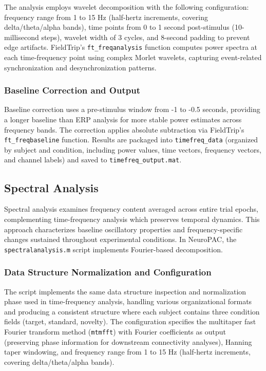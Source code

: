 \documentclass[12pt]{report}
\begin{document}
The analysis employs wavelet decomposition with the following configuration: frequency range from 1 to 15 Hz (half-hertz increments, covering delta/theta/alpha bands), time points from 0 to 1 second post-stimulus (10-millisecond steps), wavelet width of 3 cycles, and 8-second padding to prevent edge artifacts. FieldTrip's \verb|ft_freqanalysis| function computes power spectra at each time-frequency point using complex Morlet wavelets, capturing event-related synchronization and desynchronization patterns.

\subsubsection{Baseline Correction and Output}

Baseline correction uses a pre-stimulus window from -1 to -0.5 seconds, providing a longer baseline than ERP analysis for more stable power estimates across frequency bands. The correction applies absolute subtraction via FieldTrip's \verb|ft_freqbaseline| function. Results are packaged into \verb|timefreq_data| (organized by subject and condition, including power values, time vectors, frequency vectors, and channel labels) and saved to \verb|timefreq_output.mat|.

\subsection{Spectral Analysis}

Spectral analysis examines frequency content averaged across entire trial epochs, complementing time-frequency analysis which preserves temporal dynamics. This approach characterizes baseline oscillatory properties and frequency-specific changes sustained throughout experimental conditions. In NeuroPAC, the \verb|spectralanalysis.m| script implements Fourier-based decomposition.

\subsubsection{Data Structure Normalization and Configuration}

The script implements the same data structure inspection and normalization phase used in time-frequency analysis, handling various organizational formats and producing a consistent structure where each subject contains three condition fields (target, standard, novelty). The configuration specifies the multitaper fast Fourier transform method (\verb|mtmfft|) with Fourier coefficients as output (preserving phase information for downstream connectivity analyses), Hanning taper windowing, and frequency range from 1 to 15 Hz (half-hertz increments, covering delta/theta/alpha bands).
\end{document}
